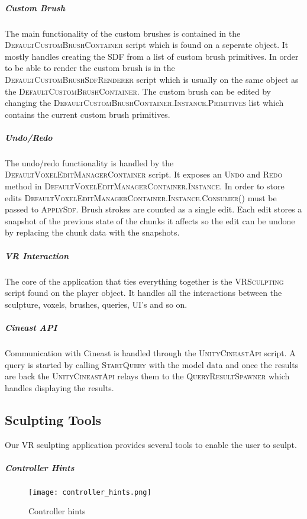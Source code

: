 \subparagraph{Custom Brush}
The main functionality of the custom brushes is contained in the \textsc{DefaultCustomBrushContainer} script which is found on a seperate object. It mostly handles creating the SDF from a list of custom brush primitives. In order to be able to render the custom brush is in the \textsc{DefaultCustomBrushSdfRenderer} script which is usually on the same object as the \textsc{DefaultCustomBrushContainer}. The custom brush can be edited by changing the \textsc{DefaultCustomBrushContainer.Instance.Primitives} list which contains the current custom brush primitives.

\subparagraph{Undo/Redo}
The undo/redo functionality is handled by the \textsc{DefaultVoxelEditManagerContainer} script. It exposes an \textsc{Undo} and \textsc{Redo} method in \textsc{DefaultVoxelEditManagerContainer.Instance}. In order to store edits \textsc{DefaultVoxelEditManagerContainer.Instance.Consumer()} must be passed to \textsc{ApplySdf}. Brush strokes are counted as a single edit. Each edit stores a snapshot of the previous state of the chunks it affects so the edit can be undone by replacing the chunk data with the snapshots.

\subparagraph{VR Interaction}
The core of the application that ties everything together is the \textsc{VRSculpting} script found on the player object. It handles all the interactions between the sculpture, voxels, brushes, queries, UI's and so on.

\subparagraph{Cineast API}
Communication with Cineast is handled through the \textsc{UnityCineastApi} script. A query is started by calling \textsc{StartQuery} with the model data and once the results are back the \textsc{UnityCineastApi} relays them to the \textsc{QueryResultSpawner} which handles displaying the results.\\


\subsection{Sculpting Tools}

Our VR sculpting application provides several tools to enable the user to sculpt.

\subparagraph{Controller Hints}

\begin{figure}
\centering
\captionsetup{width=0.8\textwidth}
\texttt{[image: controller\_hints.png]}
\caption{Controller hints}
\label{fig:controller_hints}
\end{figure}

